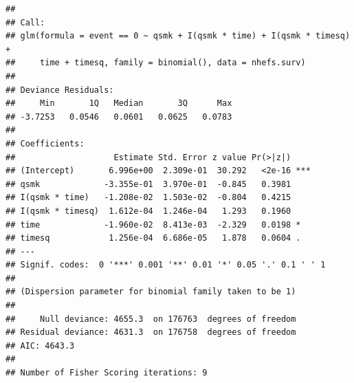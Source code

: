 \documentclass[
  10pt,
]{book}
\begin{document}
\begin{verbatim}
## 
## Call:
## glm(formula = event == 0 ~ qsmk + I(qsmk * time) + I(qsmk * timesq) + 
##     time + timesq, family = binomial(), data = nhefs.surv)
## 
## Deviance Residuals: 
##     Min       1Q   Median       3Q      Max  
## -3.7253   0.0546   0.0601   0.0625   0.0783  
## 
## Coefficients:
##                    Estimate Std. Error z value Pr(>|z|)    
## (Intercept)       6.996e+00  2.309e-01  30.292   <2e-16 ***
## qsmk             -3.355e-01  3.970e-01  -0.845   0.3981    
## I(qsmk * time)   -1.208e-02  1.503e-02  -0.804   0.4215    
## I(qsmk * timesq)  1.612e-04  1.246e-04   1.293   0.1960    
## time             -1.960e-02  8.413e-03  -2.329   0.0198 *  
## timesq            1.256e-04  6.686e-05   1.878   0.0604 .  
## ---
## Signif. codes:  0 '***' 0.001 '**' 0.01 '*' 0.05 '.' 0.1 ' ' 1
## 
## (Dispersion parameter for binomial family taken to be 1)
## 
##     Null deviance: 4655.3  on 176763  degrees of freedom
## Residual deviance: 4631.3  on 176758  degrees of freedom
## AIC: 4643.3
## 
## Number of Fisher Scoring iterations: 9
\end{verbatim}
\end{document}
